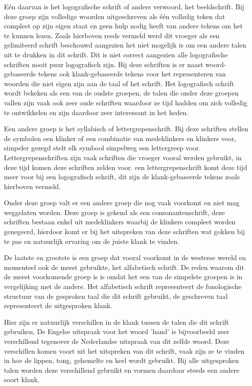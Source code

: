 Eén daarvan is het logografische schrift of anders verwoord, het beeldschrift.
Bij deze groep zijn volledige woorden uitgeschreven als één volledig teken dat compleet op zijn eigen staat en geen hulp nodig heeft van andere tekens om het te kunnen lezen.
Zoals hierboven reeds vermeld werd dit vroeger als een gelimiteerd schrift beschouwd aangezien het niet mogelijk is om een andere talen uit te drukken in dit schrift.
Dit is niet correct aangezien alle logografische schriften nooit puur logografisch zijn. Bij deze schriften is er naast woord-gebaseerde tekens ook klank-gebaseerde tekens voor het representeren van woorden die niet eigen zijn aan de taal of het schrift.
Het logografisch schrift wordt bekeken als een van de oudste groepen, de talen die onder deze groepen vallen zijn vaak ook zeer oude schriften waardoor ze tijd hadden om zich volledig te ontwikkelen en zijn daardoor zeer interessant in het heden.

Een andere groep is het syllabisch of lettergrepenschrift.
Bij deze schriften stellen de symbolen een klinker of een combinatie van medeklinkers en klinkers voor, simpeler gezegd stelt elk symbool simpelweg een lettergreep voor.
Lettergrepenschriften zijn vaak schriften die vroeger vooral werden gebruikt, in deze tijd komen deze schriften zelden voor.
een lettergrepenschrift komt deze tijd meer voor bij een logografisch schrift, dit zijn de klank-gebaseerde tekens zoals hierboven vermeld.

Onder deze groep valt er een andere groep die nog vaak voorkomt en niet mag weggelaten worden.
Deze groep is gekend als een consonantenschrift, deze schriften bestaan enkel uit medeklinkers waarbij de klinkers compleet worden genegeerd, hierdoor komt er bij het uitspreken van deze schriften wat gokken bij te pas en natuurlijk ervaring om de juiste klank te vinden.


De laatste en grootste is een groep dat vooral voorkomt in de westerse wereld en momenteel ook de meest gebruikte, het alfabetisch schrift.
De reden waarom dit de meest voorkomende groep is is omdat het een van de simpelste groepen is in vergelijking met de andere.
Het alfabetisch schrift representeert de fonologische structuur van de gesproken taal die dit schrift gebruikt, de geschreven taal representeert de uitgesproken klank.

Hier zijn er natuurlijk verschillen in de klank tussen de talen die dit schrift gebruiken, De Engelse uitspraak voor het woord 'hand' is bijvoorbeeld zeer verschillend tegenover de Nederlandse uitspraak van dit zelfde woord.
Deze verschillen komen voort uit het uitspreken van dit schrift, vaak zijn ze te vinden in hoe de lippen, tong, gehemelte en keel wordt gebruikt. Bij alle uitgesproken talen worden deze verschillend gebruikt en vormen daardoor steeds een andere soort klank. 

